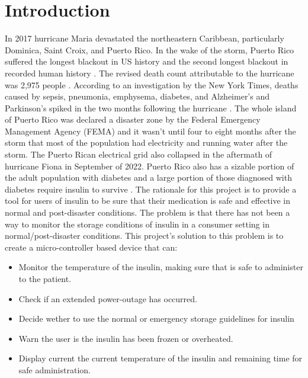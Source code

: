 \chapter{Introduction}
In 2017 hurricane Maria devastated the northeastern Caribbean, particularly Dominica, Saint Croix, and Puerto Rico. In the wake of the storm, Puerto Rico suffered the longest blackout in US history and the second longest blackout in recorded human history \cite{WorldSecondLargest}. The revised death count attributable to the hurricane was 2,975 people \cite{HurricaneMariaCaused2018}. According to an investigation by the New York Times, deaths caused by  sepsis, pneumonia, emphysema, diabetes, and Alzheimer's and Parkinson's spiked in the two months following the hurricane \cite{roblesOfficialTollPuerto2017}. The whole island of Puerto Rico was declared a disaster zone by the Federal Emergency Management Agency (FEMA) and it wasn't until four to eight months after the storm that most of the population had electricity and running water after the storm. The Puerto Rican electrical grid also collapsed in the aftermath of hurricane Fiona in September of 2022. Puerto Rico also has a sizable portion of the adult population with diabetes and a large portion of those diagnosed with diabetes require insulin to survive \cite{DiabetesPrevalencePopulation}. The rationale for this project is to provide a tool for users of insulin to be sure that their medication is safe and effective in normal and post-disaster conditions. The problem is that there has not been a way to monitor the storage conditions of insulin in a consumer setting in normal/post-disaster conditions. This project's solution to this problem is to create a micro-controller based device that can:
\begin{itemize}
  \item Monitor the temperature of the insulin, making sure that is safe to administer to the patient.
  \item Check if an extended power-outage has occurred.
  \item Decide wether to use the normal or emergency storage guidelines for insulin
  \item Warn the user is the insulin has been frozen or overheated.
  \item Display current the current temperature of the insulin and remaining time for safe administration.
\end{itemize}
